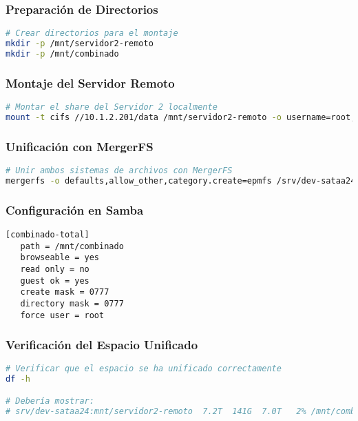 \documentclass[12pt, a4paper]{article}
\begin{document}
\subsubsection{Preparación de Directorios}
\begin{lstlisting}[language=bash, caption=Preparación de estructura de directorios]
# Crear directorios para el montaje
mkdir -p /mnt/servidor2-remoto
mkdir -p /mnt/combinado
\end{lstlisting}

\subsubsection{Montaje del Servidor Remoto}
\begin{lstlisting}[language=bash, caption=Montaje del share del Servidor 2]
# Montar el share del Servidor 2 localmente
mount -t cifs //10.1.2.201/data /mnt/servidor2-remoto -o username=root,password=root,vers=3.0
\end{lstlisting}

\subsubsection{Unificación con MergerFS}
\begin{lstlisting}[language=bash, caption=Unificación de ambos almacenamientos]
# Unir ambos sistemas de archivos con MergerFS
mergerfs -o defaults,allow_other,category.create=epmfs /srv/dev-sataa24:/mnt/servidor2-remoto /mnt/combinado
\end{lstlisting}

\subsubsection{Configuración en Samba}
\begin{lstlisting}[caption=Share Samba unificado con MergerFS]
[combinado-total]
   path = /mnt/combinado
   browseable = yes
   read only = no
   guest ok = yes
   create mask = 0777
   directory mask = 0777
   force user = root
\end{lstlisting}

\subsubsection{Verificación del Espacio Unificado}
\begin{lstlisting}[language=bash, caption=Verificación del espacio combinado]
# Verificar que el espacio se ha unificado correctamente
df -h

# Debería mostrar:
# srv/dev-sataa24:mnt/servidor2-remoto  7.2T  141G  7.0T   2% /mnt/combinado
\end{lstlisting}
\end{document}
